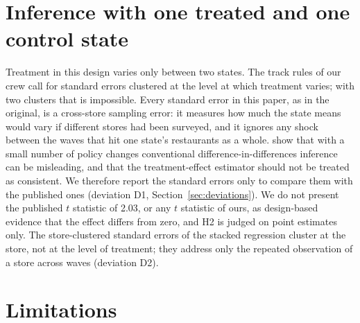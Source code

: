 \documentclass[11pt]{article}
\begin{document}
\section{Inference with one treated and one control state}
\label{sec:inference}

Treatment in this design varies only between two states. The track rules of our crew call
for standard errors clustered at the level at which treatment varies; with two clusters that
is impossible. Every standard error in this paper, as in the original, is a cross-store
sampling error: it measures how much the state means would vary if different stores had been
surveyed, and it ignores any shock between the waves that hit one state's restaurants as a
whole. \citet{conley2011inference} show that with a small number of policy changes
conventional difference-in-differences inference can be misleading, and that the
treatment-effect estimator should not be treated as consistent. We therefore report the
standard errors only to compare them with the published ones (deviation D1,
Section~\ref{sec:deviations}). We do not present the published $t$ statistic of 2.03, or any
$t$ statistic of ours, as design-based evidence that the effect differs from zero, and H2 is
judged on point estimates only. The store-clustered standard errors of the stacked regression
cluster at the store, not at the level of treatment; they address only the repeated
observation of a store across waves (deviation D2).

\section{Limitations}
\label{sec:limitations}
\end{document}
